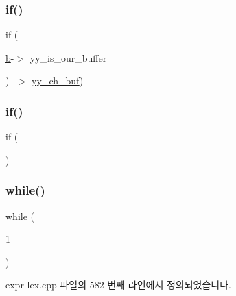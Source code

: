 \mbox{\label{expr-lex_8cpp_a19617a8b9d14dc2f89ec78655a642df4}} 
\subsubsection{\texorpdfstring{if()}{if()}\hspace{0.1cm}{\footnotesize\ttfamily [8/9]}}
{\footnotesize\ttfamily if (\begin{DoxyParamCaption}\item[{\mbox{\hyperlink{expr-lex_8cpp_a91b64995742fd30063314f12340b4b5a}{b}}-\/$>$}]{yy\+\_\+is\+\_\+our\+\_\+buffer }\end{DoxyParamCaption}) -\/$>$  \mbox{\hyperlink{expr-lex_8cpp_a49f3339224f2ff52f9191b351b184dbd}{yy\+\_\+ch\+\_\+buf}})}

\mbox{\label{expr-lex_8cpp_ac92e5ca38477fe229935a42d4c3959db}} 
\subsubsection{\texorpdfstring{if()}{if()}\hspace{0.1cm}{\footnotesize\ttfamily [9/9]}}
{\footnotesize\ttfamily if (\begin{DoxyParamCaption}{ }\end{DoxyParamCaption})}

\mbox{\label{expr-lex_8cpp_a8fdafe3be7e00ce3d4f0cb50a9a5eb39}} 
\subsubsection{\texorpdfstring{while()}{while()}\hspace{0.1cm}{\footnotesize\ttfamily [1/2]}}
{\footnotesize\ttfamily while (\begin{DoxyParamCaption}\item[{1}]{ }\end{DoxyParamCaption})}



expr-\/lex.\+cpp 파일의 582 번째 라인에서 정의되었습니다.


